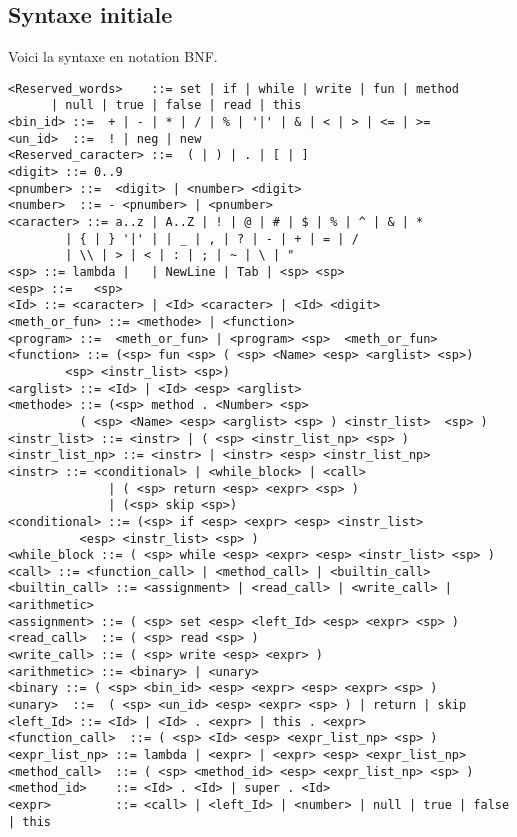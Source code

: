 \subsection{Syntaxe initiale}
Voici la syntaxe en notation BNF.
\begin{verbatim}
<Reserved_words>    ::= set | if | while | write | fun | method 
      | null | true | false | read | this 
<bin_id> ::=  + | - | * | / | % | '|' | & | < | > | <= | >=
<un_id>  ::=  ! | neg | new
<Reserved_caracter> ::=  ( | ) | . | [ | ]
<digit> ::= 0..9 
<pnumber> ::=  <digit> | <number> <digit> 
<number>  ::= - <pnumber> | <pnumber>
<caracter> ::= a..z | A..Z | ! | @ | # | $ | % | ^ | & | * 
		| { | } '|' | | _ | , | ? | - | + | = | / 
		| \\ | > | < | : | ; | ~ | \ | " 
<sp> ::= lambda |   | NewLine | Tab | <sp> <sp>
<esp> ::=   <sp>
<Id> ::= <caracter> | <Id> <caracter> | <Id> <digit>   
<meth_or_fun> ::= <methode> | <function>
<program> ::=  <meth_or_fun> | <program> <sp>  <meth_or_fun> 
<function> ::= (<sp> fun <sp> ( <sp> <Name> <esp> <arglist> <sp>) 
		<sp> <instr_list> <sp>) 
<arglist> ::= <Id> | <Id> <esp> <arglist>
<methode> ::= (<sp> method . <Number> <sp> 
	      ( <sp> <Name> <esp> <arglist> <sp> ) <instr_list>  <sp> )
<instr_list> ::= <instr> | ( <sp> <instr_list_np> <sp> ) 
<instr_list_np> ::= <instr> | <instr> <esp> <instr_list_np>
<instr> ::= <conditional> | <while_block> | <call> 
			  | ( <sp> return <esp> <expr> <sp> ) 
			  | (<sp> skip <sp>)
<conditional> ::= (<sp> if <esp> <expr> <esp> <instr_list>
		  <esp> <instr_list> <sp> ) 
<while_block ::= ( <sp> while <esp> <expr> <esp> <instr_list> <sp> ) 
<call> ::= <function_call> | <method_call> | <builtin_call> 
<builtin_call> ::= <assignment> | <read_call> | <write_call> | <arithmetic>
<assignment> ::= ( <sp> set <esp> <left_Id> <esp> <expr> <sp> ) 
<read_call>  ::= ( <sp> read <sp> ) 
<write_call> ::= ( <sp> write <esp> <expr> )
<arithmetic> ::= <binary> | <unary>
<binary ::= ( <sp> <bin_id> <esp> <expr> <esp> <expr> <sp> )
<unary>  ::=  ( <sp> <un_id> <esp> <expr> <sp> ) | return | skip
<left_Id> ::= <Id> | <Id> . <expr> | this . <expr>
<function_call>  ::= ( <sp> <Id> <esp> <expr_list_np> <sp> )
<expr_list_np> ::= lambda | <expr> | <expr> <esp> <expr_list_np>
<method_call>  ::= ( <sp> <method_id> <esp> <expr_list_np> <sp> )
<method_id>    ::= <Id> . <Id> | super . <Id> 
<expr>         ::= <call> | <left_Id> | <number> | null | true | false | this  
\end{verbatim}

